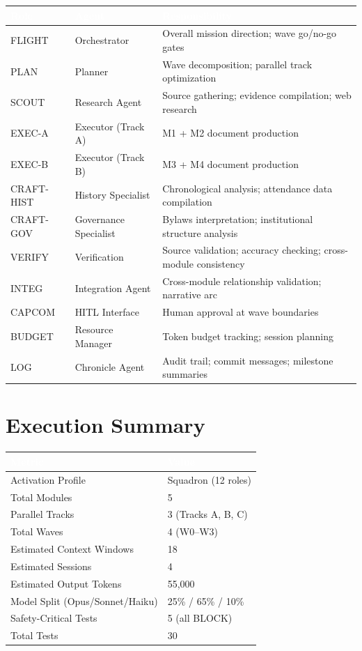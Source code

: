 \documentclass[11pt,letterpaper]{article}
\newcommand{\tableheader}[1]{\textbf{\sffamily\textcolor{white}{#1}}}
\begin{document}
\begin{center}
\begin{tabularx}{\textwidth}{L{2cm}L{3cm}X}
\toprule
{}
\tableheader{Role} & \tableheader{Agent} & \tableheader{Responsibility} \\
\midrule
FLIGHT & Orchestrator & Overall mission direction; wave go/no-go gates \\
PLAN & Planner & Wave decomposition; parallel track optimization \\
SCOUT & Research Agent & Source gathering; evidence compilation; web research \\
EXEC-A & Executor (Track A) & M1 + M2 document production \\
EXEC-B & Executor (Track B) & M3 + M4 document production \\
CRAFT-HIST & History Specialist & Chronological analysis; attendance data compilation \\
CRAFT-GOV & Governance Specialist & Bylaws interpretation; institutional structure analysis \\
VERIFY & Verification & Source validation; accuracy checking; cross-module consistency \\
INTEG & Integration Agent & Cross-module relationship validation; narrative arc \\
CAPCOM & HITL Interface & Human approval at wave boundaries \\
BUDGET & Resource Manager & Token budget tracking; session planning \\
LOG & Chronicle Agent & Audit trail; commit messages; milestone summaries \\
\bottomrule
\end{tabularx}
\end{center}

\section{Execution Summary}

\begin{center}
\begin{tabularx}{\textwidth}{L{5cm}X}
\toprule
{}
\tableheader{Metric} & \tableheader{Value} \\
\midrule
Activation Profile & Squadron (12 roles) \\
Total Modules & 5 \\
Parallel Tracks & 3 (Tracks A, B, C) \\
Total Waves & 4 (W0--W3) \\
Estimated Context Windows & 18 \\
Estimated Sessions & 4 \\
Estimated Output Tokens & 55,000 \\
Model Split (Opus/Sonnet/Haiku) & 25\% / 65\% / 10\% \\
Safety-Critical Tests & 5 (all BLOCK) \\
Total Tests & 30 \\
\bottomrule
\end{tabularx}
\end{center}
\end{document}
